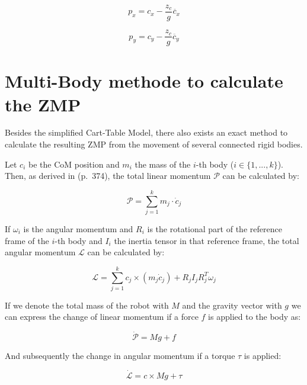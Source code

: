 \documentclass[english,ngerman]{KITreprt}
\begin{document}
\begin{equation} \label{eq:zmp-x}
p_x = c_x - \frac{z_c}{g} \ddot{c_x}
\end{equation}

\begin{equation} \label{eq:zmp-y}
p_y = c_y - \frac{z_c}{g} \ddot{c_y}
\end{equation}

\section{Multi-Body methode to calculate the
ZMP}\label{section:multi-body-zmp}

Besides the simplified Cart-Table Model, there also exists an exact
method to calculate the resulting ZMP from the movement of several
connected rigid bodies.

Let $c_i$ be the CoM position and $m_i$ the mass of the $i$-th body
($i \in \{1, ..., k\}$). Then, as derived in
\cite{siciliano2008springer} (p.~374), the total linear momentum
$\mathcal{P}$ can be calculated by:

\begin{equation}
\mathcal{P} = \sum^k_{j=1} m_j \cdot \dot{c}_j
\end{equation}

If $\omega_i$ is the angular momentum and $R_i$ is the rotational part
of the reference frame of the $i$-th body and $I_i$ the inertia tensor
in that reference frame, the total angular momentum $\mathcal{L}$ can be
calculated by:

\begin{equation}
\mathcal{L} = \sum^k_{j=1} c_j \times (m_j \dot{c}_j) + R_j I_j R^T_j \omega_j
\end{equation}

If we denote the total mass of the robot with $M$ and the gravity vector
with $g$ we can express the change of linear momentum if a force $f$ is
applied to the body as:

\begin{equation} \label{eq:change-lin-momentum}
\dot{\mathcal{P}} = M g + f
\end{equation}

And subsequently the change in angular momentum if a torque $\tau$ is
applied:

\begin{equation} \label{eq:change-ang-momentum}
\dot{\mathcal{L}} = c \times Mg + \tau
\end{equation}
\end{document}
